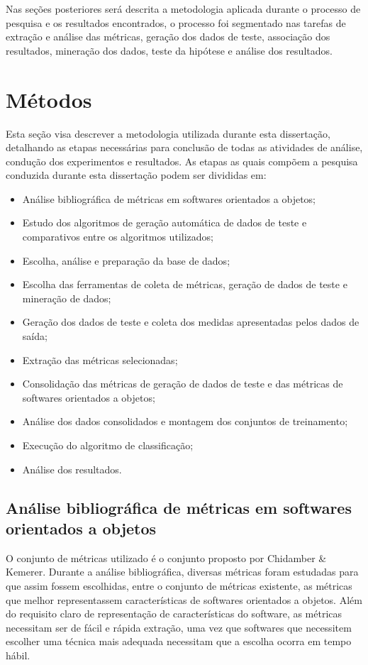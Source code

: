 \documentclass[
	12pt,				%
	oneside,			%
	a4paper,			%
	english,			%
	brazil				%
	]{abntex2ppgsi}
\begin{document}
Nas seções posteriores será descrita a metodologia aplicada durante o processo de pesquisa e os resultados encontrados, o processo foi segmentado nas tarefas de extração e análise das métricas, geração dos dados de teste, associação dos resultados, mineração dos dados, teste da hipótese e análise dos resultados.
 
 \section{Métodos}
 
 Esta seção visa descrever a metodologia utilizada durante esta dissertação, detalhando as etapas necessárias para conclusão de todas as atividades de análise, condução dos experimentos e resultados. As etapas as quais compõem a pesquisa conduzida durante esta dissertação podem ser divididas em:
 
 \begin{itemize}
  \item Análise bibliográfica de métricas em softwares orientados a objetos;
  \item Estudo dos algoritmos de geração automática de dados de teste e comparativos entre os algoritmos utilizados;
  \item Escolha, análise e preparação da base de dados;
  \item Escolha das ferramentas de coleta de métricas, geração de dados de teste e mineração de dados;
  \item Geração dos dados de teste e coleta dos medidas apresentadas pelos dados de saída;
   \item Extração das métricas selecionadas;
   \item Consolidação das métricas de geração de dados de teste e das métricas de softwares orientados a objetos;
    \item Análise dos dados consolidados e montagem dos conjuntos de treinamento;
    \item Execução do algoritmo de classificação;
    \item Análise dos resultados.
\end{itemize}

\subsection{Análise bibliográfica de métricas em softwares orientados a objetos}
O conjunto de métricas utilizado é o conjunto proposto por Chidamber \& Kemerer.  Durante a análise bibliográfica, diversas métricas foram estudadas para que assim fossem escolhidas, entre o conjunto de métricas existente, as métricas que melhor representassem características de softwares orientados a objetos. Além do requisito claro de representação de características do software, as métricas necessitam ser de fácil e rápida extração, uma vez que softwares que necessitem escolher uma técnica mais adequada necessitam que a escolha ocorra em tempo hábil. 
\end{document}
